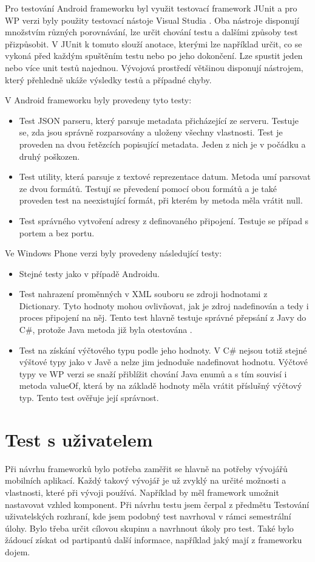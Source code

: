 Pro testování Android frameworku byl využit testovací framework JUnit \cite{junit} a pro WP verzi byly použity testovací nástoje Visual Studia \cite{vs-unit}. Oba nástroje disponují množstvím různých porovnávání, lze určit chování testu a dalšími způsoby test přizpůsobit. V JUnit k tomuto slouží anotace, kterými lze například určit, co se vykoná před každým spuštěním testu nebo po jeho dokončení. Lze spustit jeden nebo více unit testů najednou. Vývojová prostředí většinou disponují nástrojem, který přehledně ukáže výsledky testů a případné chyby. 

V Android frameworku byly provedeny tyto testy:
\begin{itemize}
\item Test JSON parseru, který parsuje metadata přicházející ze serveru. Testuje se, zda jsou správně rozparsovány a uloženy všechny vlastnosti. Test je proveden na dvou řetězcích popisující metadata. Jeden z nich je v počádku a druhý poškozen.
\item Test utility, která parsuje z textové reprezentace datum. Metoda umí parsovat ze dvou formátů. Testují se převedení pomocí obou formátů a je také proveden test na neexistující formát, při kterém by metoda měla vrátit null.
\item Test správného vytvoření adresy z definovaného připojení. Testuje se případ s portem a bez portu.
\end{itemize} 
Ve Windows Phone verzi byly provedeny následující testy:
\begin{itemize}
\item Stejné testy jako v případě Androidu.
\item Test nahrazení proměnných v XML souboru se zdroji hodnotami z Dictionary. Tyto hodnoty mohou ovlivňovat, jak je zdroj nadefinován a tedy i proces připojení na něj. Tento test hlavně testuje správné přepsání z Javy do C\#, protože Java metoda již byla otestována \cite{tomasek-thesis}.
\item Test na získání výčtového typu podle jeho hodnoty. V C\# nejsou totiž stejné výštové typy jako v Javě a nelze jim jednoduše nadefinovat hodnotu. Výčtové typy ve WP verzi se snaží přiblížit chování Java enumů a s tím souvisí i metoda valueOf, která by na základě hodnoty měla vrátit příslušný výčtový typ. Tento test ověřuje její správnost.
\end{itemize} 

\section{Test s uživatelem}
Při návrhu frameworků bylo potřeba zaměřit se hlavně na potřeby vývojářů mobilních aplikací. Každý takový vývojář je už zvyklý na určité možnosti a vlastnosti, které při vývoji používá. Například by měl framework umožnit nastavovat vzhled komponent. Při návrhu testu jsem čerpal z předmětu Testování uživatelských rozhraní, kde jsem podobný test navrhoval v rámci semestrální úlohy. Bylo třeba určit cílovou skupinu a navrhnout úkoly pro test. Také bylo žádoucí získat od partipantů další informace, například jaký mají z frameworku dojem.

